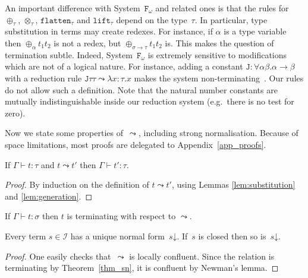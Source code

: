 \documentclass[a4paper,UKenglish,cleveref,autoref,numberwithinsect]{lipics-v2019}
\theoremstyle{definition}
\newcommand{\Fomega}{\mathtt{F}_\omega}
\newcommand{\Iterms}{\mathcal{I}}
\newcommand{\arrtype}{\rightarrow}
\newcommand{\arrW}{\leadsto}
\newcommand{\nat}{\mathtt{nat}}
\newcommand{\flatten}{\mathtt{flatten}}
\newcommand{\lift}{\mathtt{lift}}
\newcommand{\da}{\mathord{\downarrow}}
\newcommand{\proves}{\vdash}
\begin{document}
An important difference with System~$\Fomega$ and related ones is that
the rules for $\oplus_\tau$, $\otimes_\tau$, $\flatten_\tau$ and
$\lift_\tau$ depend on the type~$\tau$. In particular, type
substitution in terms may create redexes. For instance, if $\alpha$ is
a type variable then $\oplus_\alpha t_1 t_2$ is not a redex, but
$\oplus_{\sigma\arrtype\tau} t_1 t_2$ is. This makes the question of
termination subtle. Indeed, System~$\Fomega$ is extremely sensitive to
modifications which are not of a logical nature. For instance, adding
a constant $\mathtt{J} : \forall \alpha \beta . \alpha \arrtype \beta$
with a reduction rule $\mathtt{J} \tau \tau \leadsto \lambda x : \tau
. x$ makes the system non-terminating~\cite{Girard1971}. Our rules do
not allow such a definition. Note that the natural number constants
are mutually indistinguishable inside our reduction system (e.g.~there
is no test for zero).

Now we state some properties of~$\arrW$, including strong
normalisation. Because of space limitations, most proofs are
delegated to Appendix~\ref{app_proofs}.

\begin{lemma}
  If $\Gamma \proves t : \tau$ and $t \arrW t'$ then $\Gamma \proves
  t' : \tau$.
\end{lemma}

\begin{proof}
  By induction on the definition of $t \arrW t'$, using
  Lemmas \ref{lem:substitution} and \ref{lem:generation}.
\end{proof}

\begin{theorem}\label{thm_sn}
  If $\Gamma \proves t : \sigma$ then $t$ is terminating with respect
  to $\arrW$.
\end{theorem}

\begin{lemma}\label{lem_unique_final}
  Every term $s \in \Iterms$ has a unique normal form~$s\da$. If~$s$
  is closed then so is~$s\da$.
\end{lemma}

\begin{proof}
  One easily
  checks that~$\arrW$ is locally confluent. Since the
  relation is
  terminating by Theorem~\ref{thm_sn}, it is confluent by Newman's
  lemma.
\end{proof}
\end{document}

